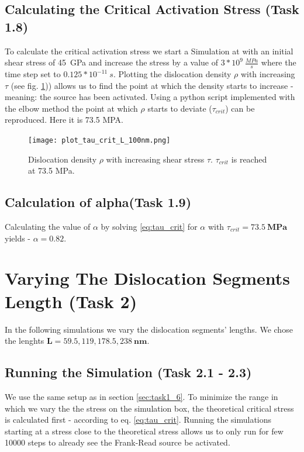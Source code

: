 \subsection{Calculating the Critical Activation Stress (Task 1.8)}
To calculate the critical activation stress we start a Simulation at with an initial shear stress of 45~GPa and increase the stress by a value of \(3*10^{9}~\frac{MPa}{s}\) where the time step set to \(0.125*10^{-11}~s\). Plotting the dislocation density \(\rho\) with increasing \(\tau\) (see fig. \ref{fig:tau_vs_rho})) allows us to find the point at which the density starts to increase - meaning: the source has been activated. Using a python script implemented with the elbow method the point at which \(\rho\) starts to deviate (\(\tau_{crit}\)) can be reproduced. Here it is 73.5 MPA.

\begin{figure}[htb]
	\centering
	\texttt{[image: plot\_tau\_crit\_L\_100nm.png]}
	\caption{Dislocation density \(\rho\) with increasing shear stress \(\tau\). \(\tau_{crit}\) is reached at 73.5 MPa. }
	\label{fig:tau_vs_rho}	
\end{figure}

\subsection{Calculation of alpha(Task 1.9)}

Calculating the value of \(\alpha\) by solving \ref{eq:tau_crit} for \(\alpha \) with \(\tau_{crit}=73.5~\mathbf{MPa} \) yields - \(\alpha = 0.82\).

\section{Varying The Dislocation Segments Length (Task 2)}
In the following simulations we vary the dislocation segments' lengths. We chose the lenghts \(\mathbf{L}=59.5 , 119, 178.5, 238~\mathbf{nm}\).
\subsection{Running the Simulation (Task 2.1 - 2.3)}
We use the same setup as in section \ref{sec:task1_6}. To minimize the range in which we vary the the stress on the simulation  box, the theoretical critical stress is calculated first - according to eq. \ref{eq:tau_crit}.  Running the simulations starting at a stress close to the theoretical stress allows us to only run for few 10000 steps to already see the Frank-Read source be activated. 

